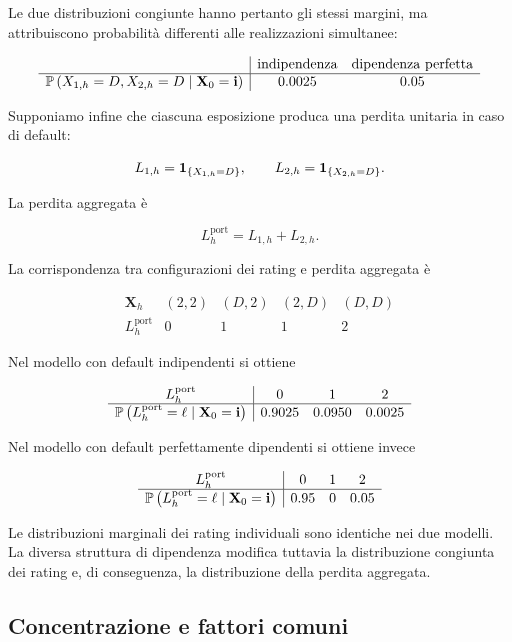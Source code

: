 \begin{example}
Le due distribuzioni congiunte hanno pertanto gli stessi margini, ma
attribuiscono probabilit\`{a} differenti alle realizzazioni
simultanee:

\[
\begin{array}{c|cc}
&
\text{indipendenza}
&
\text{dipendenza perfetta}
\\
\hline
\mathbb{P}
\left(
X_{1,h}=D,
X_{2,h}=D
\mid
\mathbf{X}_0=\mathbf{i}
\right)
&
0.0025
&
0.05
\end{array}
\]

Supponiamo infine che ciascuna esposizione produca una perdita unitaria
in caso di default:

\[
L_{1,h}
=
\mathbf{1}_{\{X_{1,h}=D\}},
\qquad
L_{2,h}
=
\mathbf{1}_{\{X_{2,h}=D\}}.
\]

La perdita aggregata \`{e}

\[
L_h^{\mathrm{port}}
=
L_{1,h}+L_{2,h}.
\]

La corrispondenza tra configurazioni dei rating e perdita aggregata
\`{e}

\[
\begin{array}{c|cccc}
\mathbf{X}_h
&
(2,2)
&
(D,2)
&
(2,D)
&
(D,D)
\\
\hline
L_h^{\mathrm{port}}
&
0
&
1
&
1
&
2
\end{array}
\]

Nel modello con default indipendenti si ottiene

\[
\begin{array}{c|ccc}
L_h^{\mathrm{port}}
&
0
&
1
&
2
\\
\hline
\mathbb{P}
\left(
L_h^{\mathrm{port}}=\ell
\mid
\mathbf{X}_0=\mathbf{i}
\right)
&
0.9025
&
0.0950
&
0.0025
\end{array}
\]

Nel modello con default perfettamente dipendenti si ottiene invece

\[
\begin{array}{c|ccc}
L_h^{\mathrm{port}}
&
0
&
1
&
2
\\
\hline
\mathbb{P}
\left(
L_h^{\mathrm{port}}=\ell
\mid
\mathbf{X}_0=\mathbf{i}
\right)
&
0.95
&
0
&
0.05
\end{array}
\]

Le distribuzioni marginali dei rating individuali sono identiche nei
due modelli. La diversa struttura di dipendenza modifica tuttavia la
distribuzione congiunta dei rating e, di conseguenza, la distribuzione
della perdita aggregata.

\end{example}

\subsection{Concentrazione e fattori comuni}


